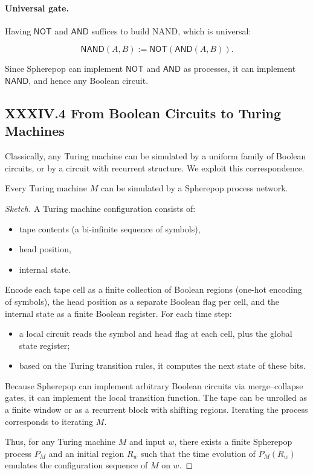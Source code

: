 \documentclass[11pt,letterpaper]{article}
\begin{document}
\paragraph{Universal gate.}
Having $\mathsf{NOT}$ and $\mathsf{AND}$ suffices to build NAND, which is universal:

\[
\mathsf{NAND}(A,B) := \mathsf{NOT}(\mathsf{AND}(A,B)).
\]

Since Spherepop can implement $\mathsf{NOT}$ and $\mathsf{AND}$ as processes, it can implement $\mathsf{NAND}$, and hence any Boolean circuit.

\subsection{XXXIV.4 From Boolean Circuits to Turing Machines}

Classically, any Turing machine can be simulated by a uniform family of Boolean circuits, or by a circuit with recurrent structure. We exploit this correspondence.

\begin{theorem}
Every Turing machine $M$ can be simulated by a Spherepop process network.
\end{theorem}

\begin{proof}[Sketch]
A Turing machine configuration consists of:

\begin{itemize}
  \item tape contents (a bi-infinite sequence of symbols),
  \item head position,
  \item internal state.
\end{itemize}

Encode each tape cell as a finite collection of Boolean regions (one-hot encoding of symbols), the head position as a separate Boolean flag per cell, and the internal state as a finite Boolean register. For each time step:

\begin{itemize}
  \item a local circuit reads the symbol and head flag at each cell, plus the global state register;
  \item based on the Turing transition rules, it computes the next state of these bits.
\end{itemize}

Because Spherepop can implement arbitrary Boolean circuits via merge--collapse gates, it can implement the local transition function. The tape can be unrolled as a finite window or as a recurrent block with shifting regions. Iterating the process corresponds to iterating $M$.

Thus, for any Turing machine $M$ and input $w$, there exists a finite Spherepop process $P_M$ and an initial region $R_w$ such that the time evolution of $P_M(R_w)$ emulates the configuration sequence of $M$ on $w$.
\end{proof}
\end{document}

